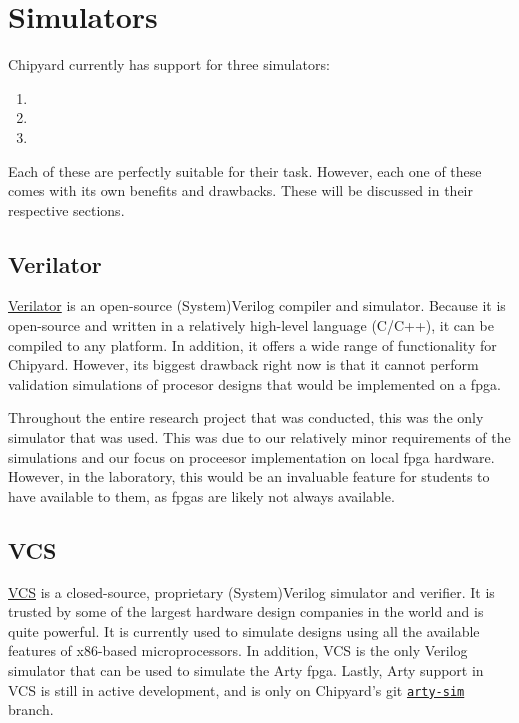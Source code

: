 \chapter{Simulators}\label{chap:Simulators}
Chipyard currently has support for three simulators:
\begin{enumerate}
\item {}
\item {}
\item {}
\end{enumerate}

Each of these are perfectly suitable for their task.
However, each one of these comes with its own benefits and drawbacks.
These will be discussed in their respective sections.

\section{Verilator}\label{sec:Verilator_Simulator}
\href{https://www.veripool.org/wiki/verilator}{Verilator} is an open-source (System)Verilog compiler and simulator.
Because it is open-source and written in a relatively high-level language (C/C++), it can be compiled to any platform.
In addition, it offers a wide range of functionality for Chipyard.
However, its biggest drawback right now is that it cannot perform validation simulations of procesor designs that would be implemented on a \gls{fpga}.

Throughout the entire research project that was conducted, this was the only simulator that was used.
This was due to our relatively minor requirements of the simulations and our focus on proceesor implementation on local \gls{fpga} hardware.
However, in the laboratory, this would be an invaluable feature for students to have available to them, as \glspl{fpga} are likely not always available.

\section{VCS}\label{sec:VCS_Simulator}
\href{https://www.synopsys.com/verification/simulation/vcs.html}{VCS} is a closed-source, proprietary (System)Verilog simulator and verifier.
It is trusted by some of the largest hardware design companies in the world and is quite powerful.
It is currently used to simulate designs using all the available features of x86-based microprocessors.
In addition, VCS is the only Verilog simulator that can be used to simulate the Arty \Gls{fpga}.
Lastly, Arty support in VCS is still in active development, and is only on Chipyard's git \href{https://github.com/ucb-bar/chipyard/tree/arty-sim}{\texttt{arty-sim}} branch.

